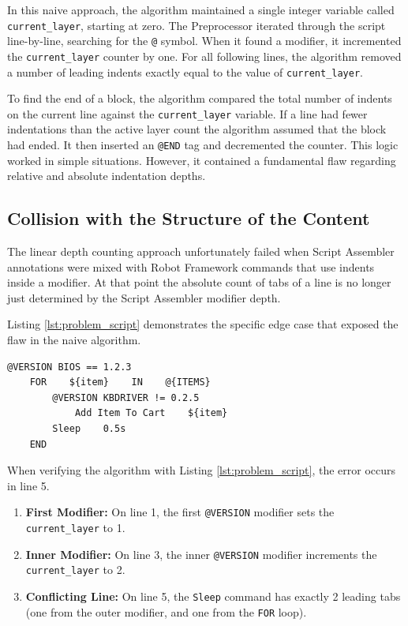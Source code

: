 In this naive approach, the algorithm maintained a single integer variable called \texttt{current\_layer}, starting at zero. The Preprocessor iterated through the script line-by-line, searching for the \texttt{@} symbol. When it found a modifier, it incremented the \texttt{current\_layer} counter by one. For all following lines, the algorithm removed a number of leading indents exactly equal to the value of \texttt{current\_layer}.


To find the end of a block, the algorithm compared the total number of indents on the current line against the \texttt{current\_layer} variable. If a line had fewer indentations than the active layer count the algorithm assumed that the block had ended. It then inserted an \texttt{@END} tag and decremented the counter. This logic worked in simple situations. However, it contained a fundamental flaw regarding relative and absolute indentation depths.


\subsection{Collision with the Structure of the Content}


The linear depth counting approach unfortunately failed when Script Assembler annotations were mixed with Robot Framework commands that use indents inside a modifier. At that point the absolute count of tabs of a line is no longer just determined by the Script Assembler modifier depth.

Listing \ref{lst:problem_script} demonstrates the specific edge case that exposed the flaw in the naive algorithm.


\begin{lstlisting}[caption={Problematic edge case}, label={lst:problem_script}]
@VERSION BIOS == 1.2.3
    FOR    ${item}    IN    @{ITEMS}
        @VERSION KBDRIVER != 0.2.5
            Add Item To Cart    ${item}
        Sleep    0.5s
    END
\end{lstlisting}


When verifying the algorithm with Listing \ref{lst:problem_script}, the error occurs in line 5.

\begin{enumerate}

    \item \textbf{First Modifier:} On line 1, the first \texttt{@VERSION} modifier sets the \texttt{current\_layer} to 1.

    \item \textbf{Inner Modifier:} On line 3, the inner \texttt{@VERSION} modifier increments the \texttt{current\_layer} to 2.

    \item \textbf{Conflicting Line:} On line 5, the \texttt{Sleep} command has exactly 2 leading tabs (one from the outer modifier, and one from the \texttt{FOR} loop).

\end{enumerate}

